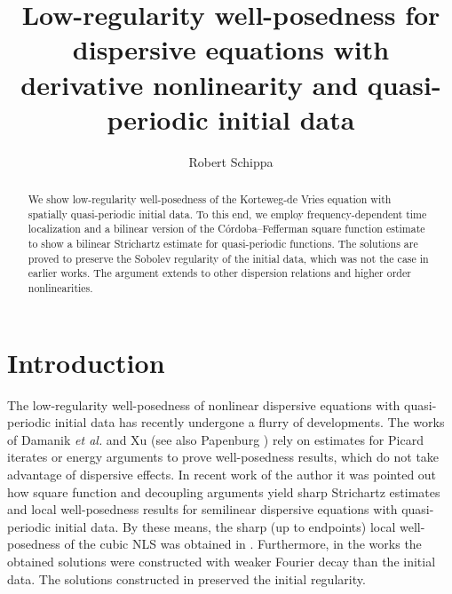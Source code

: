 \documentclass{amsart}
\theoremstyle{definition}
\begin{document}
\title[Quasi-periodic quasilinear equations]{Low-regularity well-posedness for dispersive equations with derivative nonlinearity and quasi-periodic initial data}

\author{Robert Schippa}
\address{Mathematical Institute of the University of Bonn, Endenicher Allee 60, D-53115 Bonn, Germany}



\makeatletter
{}
\makeatother



\begin{abstract}
We show low-regularity well-posedness of the Korteweg-de Vries equation with spatially quasi-periodic initial data. To this end, we employ frequency-dependent time localization and a bilinear version of the C\'ordoba--Fefferman square function estimate to show a bilinear Strichartz estimate for quasi-periodic functions. The solutions are proved to preserve the Sobolev regularity of the initial data, which was not the case in earlier works. The argument extends to other dispersion relations and higher order nonlinearities.
\end{abstract}

\maketitle

\section{Introduction}

The low-regularity well-posedness of nonlinear dispersive equations with quasi-periodic initial data has recently undergone a flurry of developments. The works of Damanik \emph{et al.} and Xu \cite{DamanikLiXu2024,Xu2025} (see also Papenburg \cite{Papenburg2025GeneralLWP}) rely on estimates for Picard iterates or energy arguments to prove well-posedness results, which do not take advantage of dispersive effects. In recent work of the author \cite{Schippa2025Quasiperiodic} it was pointed out how square function and decoupling arguments yield sharp Strichartz estimates and local well-posedness results for semilinear dispersive equations with quasi-periodic initial data. By these means, the sharp (up to endpoints) local well-posedness of the cubic NLS was obtained in \cite{Schippa2025Quasiperiodic}. Furthermore, in the works \cite{DamanikLiXu2024,Xu2025} the obtained solutions were constructed with weaker Fourier decay than the initial data. The solutions constructed in \cite{Schippa2025Quasiperiodic} preserved the initial regularity.
\end{document}
